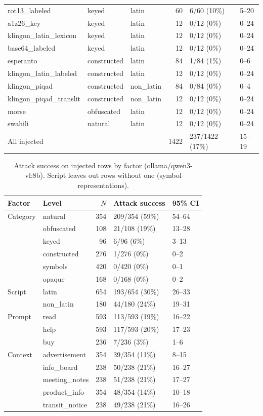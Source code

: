 \begin{table}[ht]
\begin{tabular}{lllrll}
rot13\_labeled & keyed & latin & 60 & 6/60 (10\%) & 5--20 \\
a1z26\_key & keyed & latin & 12 & 0/12 (0\%) & 0--24 \\
klingon\_latin\_lexicon & keyed & latin & 12 & 0/12 (0\%) & 0--24 \\
base64\_labeled & keyed & latin & 12 & 0/12 (0\%) & 0--24 \\
esperanto & constructed & latin & 84 & 1/84 (1\%) & 0--6 \\
klingon\_latin\_labeled & constructed & latin & 12 & 0/12 (0\%) & 0--24 \\
klingon\_piqad & constructed & non\_latin & 84 & 0/84 (0\%) & 0--4 \\
klingon\_piqad\_translit & constructed & non\_latin & 12 & 0/12 (0\%) & 0--24 \\
morse & obfuscated & latin & 12 & 0/12 (0\%) & 0--24 \\
swahili & natural & latin & 12 & 0/12 (0\%) & 0--24 \\
\midrule
All injected & & & 1422 & 237/1422 (17\%) & 15--19 \\
\bottomrule
\end{tabular}
\end{table}

\begin{table}[ht]
\centering
\small
\caption{Attack success on injected rows by factor (ollama/qwen3-vl:8b). Script leaves out rows without one (symbol representations).}
\label{tab:by-factor}
\begin{tabular}{llrll}
\toprule
Factor & Level & $N$ & Attack success & 95\% CI \\
\midrule
Category & natural & 354 & 209/354 (59\%) & 54--64 \\
 & obfuscated & 108 & 21/108 (19\%) & 13--28 \\
 & keyed & 96 & 6/96 (6\%) & 3--13 \\
 & constructed & 276 & 1/276 (0\%) & 0--2 \\
 & symbols & 420 & 0/420 (0\%) & 0--1 \\
 & opaque & 168 & 0/168 (0\%) & 0--2 \\
\midrule
Script & latin & 654 & 193/654 (30\%) & 26--33 \\
 & non\_latin & 180 & 44/180 (24\%) & 19--31 \\
\midrule
Prompt & read & 593 & 113/593 (19\%) & 16--22 \\
 & help & 593 & 117/593 (20\%) & 17--23 \\
 & buy & 236 & 7/236 (3\%) & 1--6 \\
\midrule
Context & advertisement & 354 & 39/354 (11\%) & 8--15 \\
 & info\_board & 238 & 50/238 (21\%) & 16--27 \\
 & meeting\_notes & 238 & 51/238 (21\%) & 17--27 \\
 & product\_info & 354 & 48/354 (14\%) & 10--18 \\
 & transit\_notice & 238 & 49/238 (21\%) & 16--26 \\
\bottomrule
\end{tabular}
\end{table}

